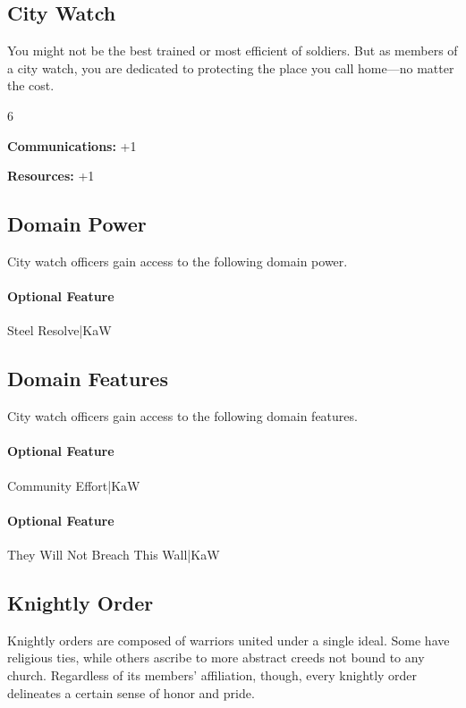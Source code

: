 \documentclass[10pt,a4paper,twoside,bg=print,twocolumn,openany,nodeprecatedcode]{dndbook}
\begin{document}
\subsection{City Watch}
You might not be the best trained or most efficient of soldiers. But as members of a city watch, you are dedicated to protecting the place you call home—no matter the cost.

{\par \vspace { 9pt plus 3pt minus 3pt } \noindent  {} \nopagebreak }

\begin{itemize}
\begin{multicols}{6}
\item \textbf{Communications:} +1
\item \textbf{Resources:} +1
\end{multicols}

\end{itemize}

\subsection{Domain Power}
City watch officers gain access to the following domain power.

\paragraph{Optional Feature}
Steel Resolve|KaW

\subsection{Domain Features}
City watch officers gain access to the following domain features.

\paragraph{Optional Feature}
Community Effort|KaW

\paragraph{Optional Feature}
They Will Not Breach This Wall|KaW

\subsection{Knightly Order}
Knightly orders are composed of warriors united under a single ideal. Some have religious ties, while others ascribe to more abstract creeds not bound to any church. Regardless of its members' affiliation, though, every knightly order delineates a certain sense of honor and pride.
\end{document}

